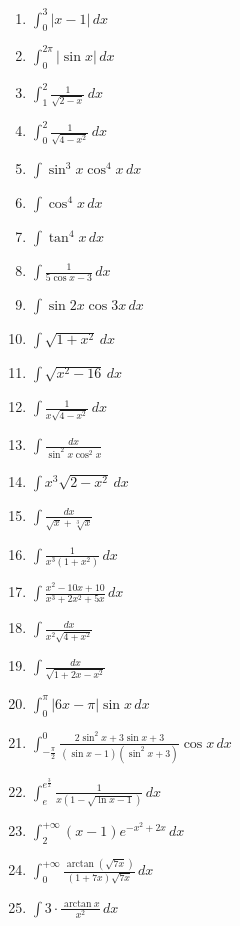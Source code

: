 \documentclass[11pt,a4paper]{article}
\begin{document}
\begin{enumerate}
\item $\displaystyle \int_{0}^{3} |x - 1| \, dx$
\item $\displaystyle \int_{0}^{2\pi} |\sin x| \, dx$
\item $\displaystyle \int_{1}^{2} \frac{1}{\sqrt{2 - x}} \, dx$
\item $\displaystyle \int_{0}^{2} \frac{1}{\sqrt{4 - x^{2}}} \, dx$
\item $\displaystyle \int \sin^{3} x \cos^{4} x \, dx$
\item $\displaystyle \int \cos^{4} x \, dx$
\item $\displaystyle \int \tan^{4} x \, dx$
\item $\displaystyle \int \frac{1}{5\cos x - 3} \, dx$
\item $\displaystyle \int \sin 2x \cos 3x \, dx$
\item $\displaystyle \int \sqrt{1 + x^{2}} \, dx$
\item $\displaystyle \int \sqrt{x^{2} - 16} \, dx$
\item $\displaystyle \int \frac{1}{x\sqrt{4 - x^{2}}} \, dx$
\item $\displaystyle \int \frac{dx}{\sin^{2} x \cos^{2} x}$
\item $\displaystyle \int x^{3}\sqrt{2 - x^{2}} \, dx$
\item $\displaystyle \int \frac{dx}{\sqrt{x} + \sqrt[3]{x}}$
\item $\displaystyle \int \frac{1}{x^{3}\left(1 + x^{2}\right)} \, dx$
\item $\displaystyle \int \frac{x^{2} - 10x + 10}{x^{3} + 2x^{2} + 5x} \, dx$
\item $\displaystyle \int \frac{dx}{x^{2}\sqrt{4 + x^{2}}}$
\item $\displaystyle \int \frac{dx}{\sqrt{1 + 2x - x^{2}}}$
\item $\displaystyle \int_{0}^{\pi} |6x - \pi|\sin x \, dx$
\item $\displaystyle \int_{-\frac{\pi}{2}}^{0} \frac{2\sin^{2} x + 3\sin x + 3}{(\sin x - 1)\left(\sin^{2} x + 3\right)}\cos x \, dx$
\item $\displaystyle \int_{e}^{e^{\frac{3}{2}}} \frac{1}{x\left(1 - \sqrt{\ln x - 1}\right)} \, dx$
\item $\displaystyle \int_{2}^{+\infty} (x - 1) e^{-x^{2} + 2x} \, dx$
\item $\displaystyle \int_{0}^{+\infty} \frac{\arctan\left(\sqrt{7x}\right)}{(1 + 7x)\sqrt{7x}} \, dx$
\item $\displaystyle \int 3 \cdot \frac{\arctan x}{x^{2}} \, dx$

\end{enumerate}
\end{document}
